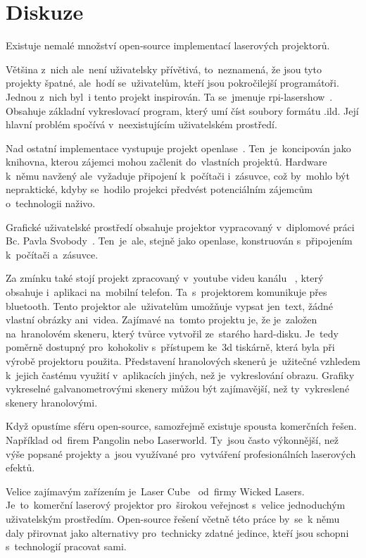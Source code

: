 \chapter{Diskuze}

Existuje nemalé množství open-source implementací laserových projektorů.

Většina z~nich ale~není uživatelsky přívětivá, to~neznamená, že jsou tyto projekty špatné, ale~hodí se~uživatelům, kteří jsou pokročilejší programátoři. 
Jednou z~nich byl~i tento projekt inspirován.
Ta se~jmenuje rpi-lasershow~\cite{rpi-lasershow}. Obsahuje základní vykreslovací program, který umí číst soubory formátu .ild. Její hlavní problém spočívá v~neexistujícím uživatelském prostředí.

Nad ostatní implementace vystupuje projekt openlase~\cite{openlase}. Ten~je~koncipován jako knihovna, kterou zájemci mohou začlenit do~vlastních projektů.
Hardware k~němu navžený ale~vyžaduje připojení k~počítači i~zásuvce, což by~mohlo být nepraktické, kdyby se~hodilo projekci předvést potenciálním zájemcům o~technologii naživo.

Grafické uživatelské prostředí obsahuje projektor vypracovaný v~diplomové práci Bc. Pavla Svobody~\cite{vut-chabr}. Ten~je~ale, stejně jako openlase, konstruován s~připojením k~počítači a~zásuvce.

Za zmínku také stojí projekt zpracovaný v~youtube videu kanálu ~\cite{harddrive-projector-youtube}, který obsahuje i~aplikaci na~mobilní telefon. Ta~s~projektorem komunikuje přes bluetooth. Tento projektor ale~uživatelům umožňuje vypsat jen~text, žádné vlastní obrázky ani~videa.
Zajímavé na~tomto projektu je, že je~založen na~hranolovém skeneru, který tvůrce vytvořil ze~starého hard-disku. Je~tedy poměrně dostupný pro~kohokoliv s~přístupem ke~3d tiskárně, která byla při výrobě projektoru použita.
Představení hranolových skenerů je~užitečné vzhledem k~jejich častému využití v~aplikacích jiných, než je~vykreslování obrazu. Grafiky vykreselné galvanometrovými skenery můžou být zajímavější, než ty~vykreslené skenery hranolovými.

Když opustíme sféru open-source, samozřejmě existuje spousta komerčních řešen. Například od~firem Pangolin nebo Laserworld. Ty~jsou často výkonnější, než výše popsané projekty a~jsou využívané pro~vytváření profesionálních laserových efektů.

Velice zajímavým zařízením je~Laser Cube~\cite{lasercube} od~firmy Wicked Lasers. Je~to~komerční laserový projektor pro~širokou veřejnost s~velice jednoduchým uživatelským prostředím. Open-source řešení včetně této práce by~se~k němu daly přirovnat jako alternativy pro~technicky zdatné jedince, kteří jsou schopni s~technologií pracovat sami.
